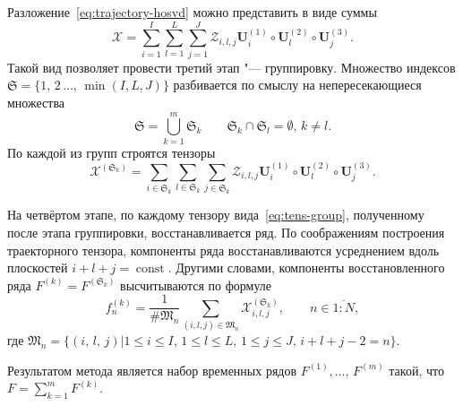 \documentclass[specialist,
    substylefile = spbu_report.rtx,
    subf,href,colorlinks=true, 12pt]{disser}
\theoremstyle{plain}
\theoremstyle{definition}
\theoremstyle{remark}
\begin{document}
    Разложение~\eqref{eq:trajectory-hosvd} можно представить в виде суммы
    \[
        \mathcal{X}=\sum_{i=1}^{I} \sum_{l=1}^{L} \sum_{j=1}^{J} \mathcal{Z}_{i,l,j} \mathbf{U}^{(1)}_{i}
        \circ \mathbf{U}^{(2)}_{l} \circ \mathbf{U}^{(3)}_{j}.
    \]
    Такой вид позволяет провести третий этап "--- группировку.
    Множество индексов $\mathfrak{S}=\{1,\, 2\,\ldots,\, \min(I, L, J)\}$ разбивается по смыслу на непересекающиеся множества
    \[\mathfrak{S}=\bigcup_{k=1}^{m}\mathfrak{S}_k \qquad \mathfrak{S}_k\cap \mathfrak{S}_l =\emptyset,\, k\ne l.\]
    По каждой из групп строятся тензоры
    \begin{equation}
        \mathcal{X}^{(\mathfrak{S}_k)}=\sum_{i \in \mathfrak{S}_k} \sum_{l\in \mathfrak{S}_k} \sum_{j\in \mathfrak{S}_k}
        \mathcal{Z}_{i,l,j} \mathbf{U}^{(1)}_{i}\circ \mathbf{U}^{(2)}_{l} \circ \mathbf{U}^{(3)}_{j}.\label{eq:tens-group}
    \end{equation}

    На четвёртом этапе, по каждому тензору вида~\eqref{eq:tens-group}, полученному после этапа группировки, восстанавливается ряд.
    По соображениям построения траекторного тензора, компоненты ряда восстанавливаются усреднением вдоль плоскостей $i+l+j=\operatorname{const}$.
    Другими словами, компоненты восстановленного ряда $F^{(k)}=F^{(\mathfrak{S}_k)}$ высчитываются по формуле
    \[
        f^{(k)}_n=\frac{1}{\#\mathfrak{M}_n}\sum_{(i,l,j)\in \mathfrak{M}_n} \mathcal{X}^{(\mathfrak{S}_k)}_{i,l,j},\qquad n\in \overline{1:N},
    \]
    где $\mathfrak{M}_n=\{(i,\, l,\, j) | 1\leqslant i \leqslant I,\, 1\leqslant l \leqslant L,\, 1\leqslant j \leqslant J,\, i+l+j-2=n\}$.

    Результатом метода является набор временных рядов $F^{(1)},\ldots,\, F^{(m)}$ такой, что ${F=\sum_{k=1}^{m}F^{(k)}}$.
\end{document}
